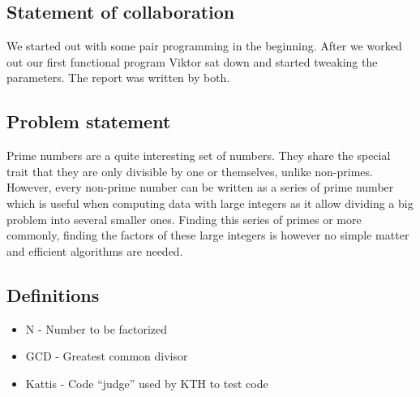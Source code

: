\subsection{Statement of collaboration}
We started out with some pair programming in the beginning. After we worked out our first functional program Viktor sat down and started tweaking the parameters. The report was written by both.  

\subsection{Problem statement}
Prime numbers are a quite interesting set of numbers. They share the special trait that they are only divisible by one or themselves, unlike non-primes. However, every non-prime number can be written as a series of prime number which is useful when computing data with large integers as it allow dividing a big problem into several smaller ones.
Finding this series of primes or more commonly, finding the factors of these large integers is however no simple matter and efficient algorithms are needed.

\subsection{Definitions}
	
\begin{itemize}
  \item N - Number to be factorized
  \item GCD - Greatest common divisor
  \item Kattis - Code “judge” used by KTH to test code
\end{itemize}